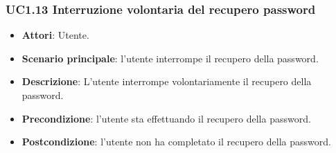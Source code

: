 \subsubsection{UC1.13 Interruzione volontaria del recupero password}
\begin{itemize}
\item \textbf{Attori}: Utente.
\item \textbf{Scenario principale}: l'utente interrompe il recupero della password.
\item \textbf{Descrizione}: L'utente interrompe volontariamente il recupero della password.
\item \textbf{Precondizione}: l'utente sta effettuando il recupero della password.
\item \textbf{Postcondizione}: l'utente non ha completato il recupero della password.
\end{itemize}
